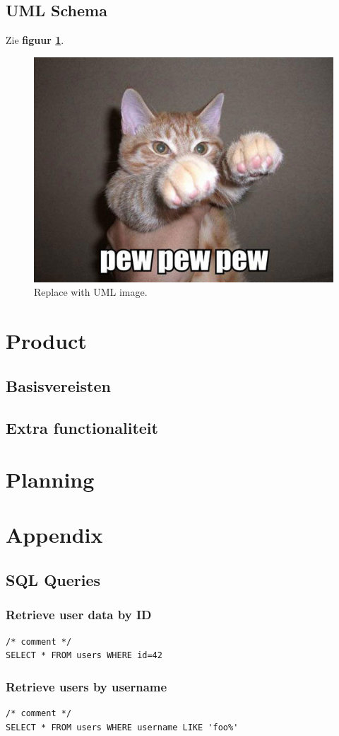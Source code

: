 \documentclass[11pt]{article}
\begin{document}
  \subsection{UML Schema}
  Zie \textbf{figuur \ref{fig:uml}}.
  \begin{figure}[H]
  \centering
    \includegraphics[width=\textwidth]{img/pew_pew.jpg}
  \caption{Replace with UML image.}
  \label{fig:uml}
  \end{figure}
\section{Product}
  \subsection{Basisvereisten}
  \subsection{Extra functionaliteit}
\section{Planning}
\section{Appendix}
  \subsection{SQL Queries}
  \subsubsection{Retrieve user data by ID}
\begin{lstlisting}[style=SQL]
/* comment */
SELECT * FROM users WHERE id=42
\end{lstlisting}

  \subsubsection{Retrieve users by username}
\begin{lstlisting}[style=SQL]
/* comment */
SELECT * FROM users WHERE username LIKE 'foo%'
\end{lstlisting}
\end{document}
